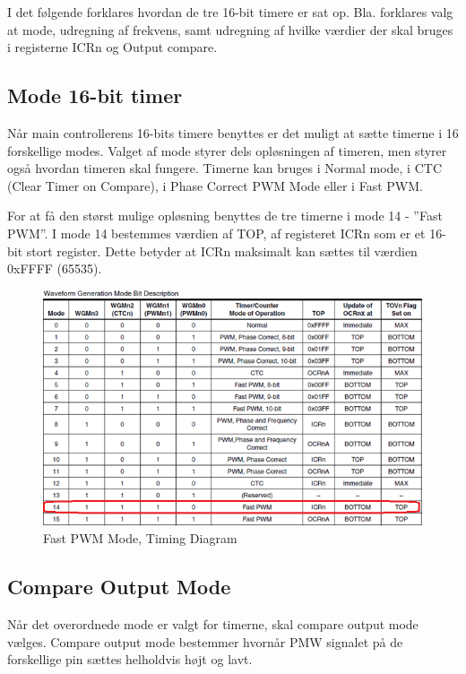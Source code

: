 \newpage

I det følgende forklares hvordan de tre 16-bit timere er sat op. Bla. forklares valg at mode, udregning af frekvens, samt udregning af hvilke værdier der skal bruges i registerne ICRn og Output compare.

\subsection*{Mode 16-bit timer}

Når main controllerens 16-bits timere benyttes er det muligt at sætte timerne i 16 forskellige modes. Valget af mode styrer dels opløsningen af timeren, men styrer også hvordan timeren skal fungere. Timerne kan bruges i Normal mode, i CTC (Clear Timer on Compare), i Phase Correct PWM Mode eller i Fast PWM.

For at få den størst mulige opløsning benyttes de tre timerne i mode 14 - ”Fast PWM”. I mode 14 bestemmes værdien af TOP, af registeret ICRn som er et 16-bit stort register. Dette betyder at ICRn maksimalt kan sættes til værdien 0xFFFF (65535). 

\begin{figure}[H]
	\centering
	\includegraphics[width=1.\textwidth]{Billeder/Timer/1_mode.png}
	\caption{Fast PWM Mode, Timing Diagram}
	\label{fig:Timing_diagram}
\end{figure}

\newpage

\subsection*{Compare Output Mode}
Når det overordnede mode er valgt for timerne, skal compare output mode vælges. Compare output mode bestemmer hvornår PMW signalet på de forskellige pin sættes helholdvis højt og lavt.

